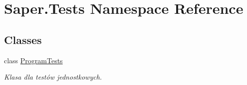 \hypertarget{namespace_saper_1_1_tests}{}\section{Saper.\+Tests Namespace Reference}
\label{namespace_saper_1_1_tests}
\subsection*{Classes}
\begin{DoxyCompactItemize}
\item 
class \mbox{\hyperlink{class_saper_1_1_tests_1_1_program_tests}{Program\+Tests}}
\begin{DoxyCompactList}\small\item\em Klasa dla testów jednostkowych. \end{DoxyCompactList}\end{DoxyCompactItemize}
